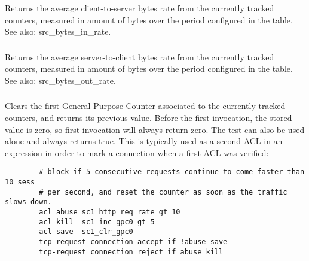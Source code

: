 \subsubsection[sc2\_bytes\_in\_rate]{}
  Returns the average client-to-server bytes rate from the currently tracked
  counters, measured in amount of bytes over the period configured in the
  table. See also: src\_bytes\_in\_rate.

\subsubsection[sc1\_bytes\_out\_rate]{}
\subsubsection[sc2\_bytes\_out\_rate]{}
  Returns the average server-to-client bytes rate from the currently tracked
  counters, measured in amount of bytes over the period configured in the
  table. See also: src\_bytes\_out\_rate.

\subsubsection[sc1\_clr\_gpc0]{}
\subsubsection[sc2\_clr\_gpc0]{}
  Clears the first General Purpose Counter associated to the currently tracked
  counters, and returns its previous value. Before the first invocation, the
  stored value is zero, so first invocation will always return zero. The test
  can also be used alone and always returns true. This is typically used as a
  second ACL in an expression in order to mark a connection when a first ACL
  was verified:
  
  \begin{verbatim}
        # block if 5 consecutive requests continue to come faster than 10 sess
        # per second, and reset the counter as soon as the traffic slows down.
        acl abuse sc1_http_req_rate gt 10
        acl kill  sc1_inc_gpc0 gt 5
        acl save  sc1_clr_gpc0
        tcp-request connection accept if !abuse save
        tcp-request connection reject if abuse kill
  \end{verbatim}

